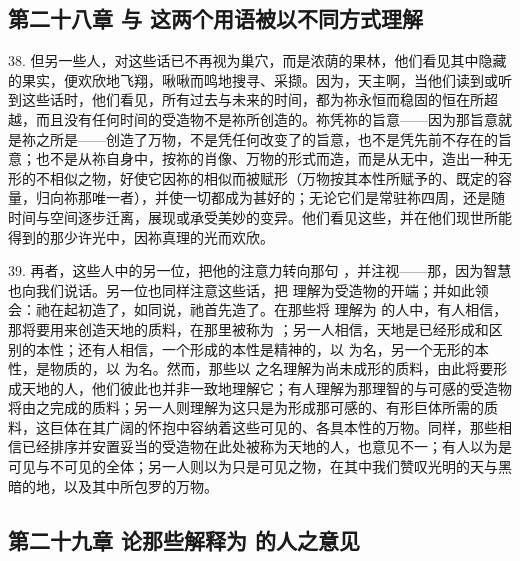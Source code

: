 
\subsection{第二十八章  与  这两个用语被以不同方式理解}

38. 但另一些人，对这些话已不再视为巢穴，而是浓荫的果林，他们看见其中隐藏的果实，便欢欣地飞翔，啾啾而鸣地搜寻、采撷。因为，天主啊，当他们读到或听到这些话时，他们看见，所有过去与未来的时间，都为祢永恒而稳固的恒在所超越，而且没有任何时间的受造物不是祢所创造的。祢凭祢的旨意——因为那旨意就是祢之所是——创造了万物，不是凭任何改变了的旨意，也不是凭先前不存在的旨意；也不是从祢自身中，按祢的肖像、万物的形式而造，而是从无中，造出一种无形的不相似之物，好使它因祢的相似而被赋形（万物按其本性所赋予的、既定的容量，归向祢那唯一者），并使一切都成为甚好的；无论它们是常驻祢四周，还是随时间与空间逐步迁离，展现或承受美妙的变异。他们看见这些，并在他们现世所能得到的那少许光中，因祢真理的光而欢欣。\par

39. 再者，这些人中的另一位，把他的注意力转向那句 ，并注视——那，因为智慧也向我们说话。另一位也同样注意这些话，把  理解为受造物的开端；并如此领会：祂在起初造了，如同说，祂首先造了。在那些将  理解为  的人中，有人相信，那将要用来创造天地的质料，在那里被称为 ；另一人相信，天地是已经形成和区别的本性；还有人相信，一个形成的本性是精神的，以  为名，另一个无形的本性，是物质的，以  为名。然而，那些以  之名理解为尚未成形的质料，由此将要形成天地的人，他们彼此也并非一致地理解它；有人理解为那理智的与可感的受造物将由之完成的质料；另一人则理解为这只是为形成那可感的、有形巨体所需的质料，这巨体在其广阔的怀抱中容纳着这些可见的、各具本性的万物。同样，那些相信已经排序并安置妥当的受造物在此处被称为天地的人，也意见不一；有人以为是可见与不可见的全体；另一人则以为只是可见之物，在其中我们赞叹光明的天与黑暗的地，以及其中所包罗的万物。\par


\subsection{第二十九章 论那些解释为  的人之意见}

